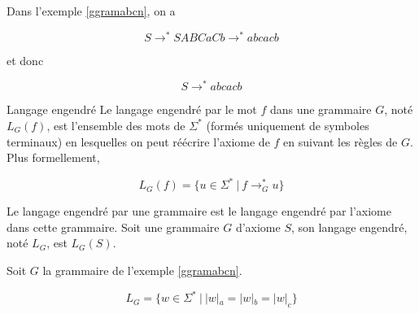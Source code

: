 \begin{example}
Dans l'exemple \ref{ggramabcn}, on a 

\[
S \rightarrow^* SABCaCb \rightarrow^* abcacb
\]

et donc 

\[
S \rightarrow^* abcacb
\]
\end{example}
 

\begin{definition}{Langage engendré}{}
Le langage engendré par le mot $f$ dans une grammaire $G$, noté $L_G(f)$, est l'ensemble des mots de $\Sigma^*$ (formés uniquement de symboles terminaux) en lesquelles on peut réécrire l'axiome de $f$ en suivant les règles de $G$. Plus formellement,

\[
L_G(f) = \{u \in \Sigma^* ~|~f \rightarrow_G^* u\}
\]

Le langage engendré par une grammaire est le langage engendré par l'axiome dans cette grammaire. Soit une grammaire $G$ d'axiome $S$, son langage engendré, noté $L_G$, est $L_G(S)$.
\end{definition}

\begin{example}
Soit $G$ la grammaire de l'exemple \ref{ggramabcn}. 

\[
L_G = \{w \in \Sigma^* ~|~|w|_a = |w|_b = |w|_c \}
\]
\end{example}